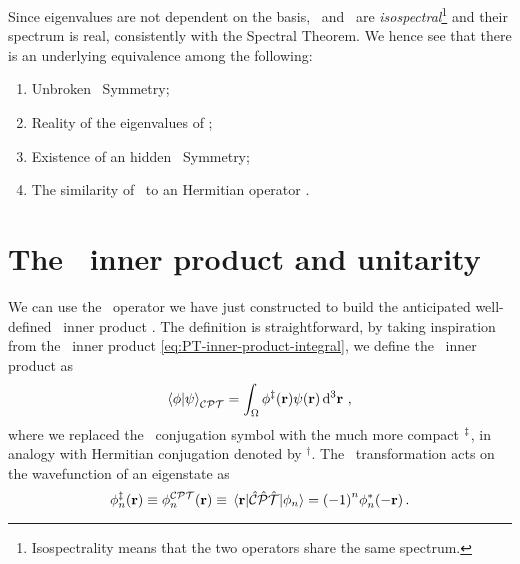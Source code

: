             Since eigenvalues are not dependent on the basis, \hH\ and \hF\ are \emph{isospectral}\footnote{Isospectrality means that the two operators share the same spectrum.} and their spectrum is real, consistently with the Spectral Theorem. We hence see that there is an underlying equivalence among the following:
            \begin{enumerate}[label = \mybullet]
                \item Unbroken \PT\ Symmetry;
                \item Reality of the eigenvalues of \hH;
                \item Existence of an hidden \CPT\ Symmetry;
                \item The similarity of \hH\ to an Hermitian operator \hF.
            \end{enumerate}

    \section{The \CPT\ inner product and unitarity}
        We can use the \hC\ operator we have just constructed to build the anticipated well-defined \CPT\ inner product \cite{bender2024}. The definition is straightforward, by taking inspiration from the \PT\ inner product \eqref{eq:PT-inner-product-integral}, we define the \CPT\ inner product as
        \begin{equation}
            \label{eq:CPT-inner-product}
            \braket{\phi}{\psi}_{\CPT} = \int\nolimits_\Omega \phi^{\myconj}\pqty{\vb{r}} \psi\pqty{\vb{r}} \dd[3]{\vb{r}}
            \mycomma
        \end{equation}
        where we replaced the \CPT\ conjugation symbol with the much more compact $^\ddag$, in analogy with Hermitian conjugation denoted by $^\dag$. The \CPT\ transformation acts on the wavefunction of an eigenstate as
        \begin{equation}
            \label{eq:CPT-conjugation}
            \phi_n^\myconj\pqty{\vb{r}}
            \equiv \phi_n^{\CPT}\pqty{\vb{r}}
            \equiv \mel{\vb{r}}{\hCPT}{\phi_n}
            = \pqty{-1}^n \phi_n^*\pqty{-\vb{r}}
            \myperiod
        \end{equation}

